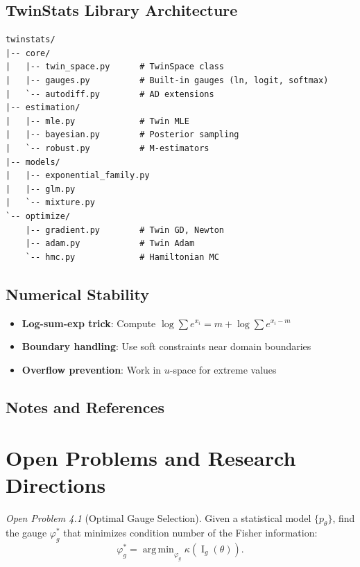 \documentclass[11pt,twoside]{book}
\theoremstyle{plain}
\theoremstyle{definition}
\theoremstyle{remark}
\newtheorem{openproblem}{Open Problem}[chapter]
\DeclareMathOperator*{\argmin}{arg\,min}
\DeclareMathOperator{\Fisher}{I}
\begin{document}
\section{TwinStats Library Architecture}
\label{sec:twinstats}

\begin{verbatim}
twinstats/
|-- core/
|   |-- twin_space.py      # TwinSpace class
|   |-- gauges.py          # Built-in gauges (ln, logit, softmax)
|   `-- autodiff.py        # AD extensions
|-- estimation/
|   |-- mle.py             # Twin MLE
|   |-- bayesian.py        # Posterior sampling
|   `-- robust.py          # M-estimators
|-- models/
|   |-- exponential_family.py
|   |-- glm.py
|   `-- mixture.py
`-- optimize/
    |-- gradient.py        # Twin GD, Newton
    |-- adam.py            # Twin Adam
    `-- hmc.py             # Hamiltonian MC
\end{verbatim}

\section{Numerical Stability}
\label{sec:stability}

\begin{itemize}
    \item \textbf{Log-sum-exp trick}: Compute $\log \sum e^{x_i} = m + \log \sum e^{x_i - m}$
    \item \textbf{Boundary handling}: Use soft constraints near domain boundaries
    \item \textbf{Overflow prevention}: Work in $u$-space for extreme values
\end{itemize}

\section{Notes and References}
\label{sec:ch18_notes}


\chapter{Open Problems and Research Directions}
\label{ch:open_problems}

\begin{openproblem}[Optimal Gauge Selection]
    Given a statistical model $\{p_\theta\}$, find the gauge $\varphi_g^*$ that minimizes condition number of the Fisher information:
    \[
    \varphi_g^* = \argmin_{\varphi_g} \kappa(\Fisher_g(\theta)).
    \]
\end{openproblem}
\end{document}
